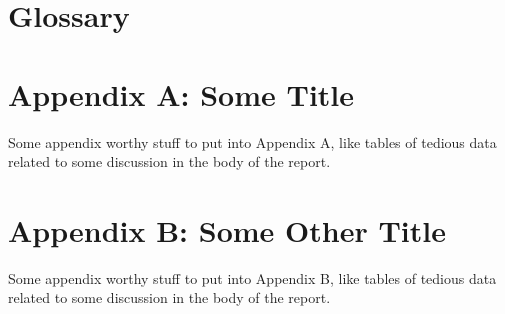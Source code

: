 \documentclass[11pt, a4paper]{article}
\begin{document}
\begin{singlespacing}
    
    \pagebreak
    \nocite{*}
    
    \renewcommand{\bibname}{\Large References}
    
    
    \pagebreak
    \section*{Glossary}
    
    \pagebreak
    \section*{Appendix A: Some Title}
    Some appendix worthy stuff to put into Appendix A, like tables of tedious data related to some discussion in the body of the report.
    
    \pagebreak
    \section*{Appendix B: Some Other Title}
    Some appendix worthy stuff to put into Appendix B, like tables of tedious data related to some discussion in the body of the report.
    
\end{singlespacing}
\end{document}
